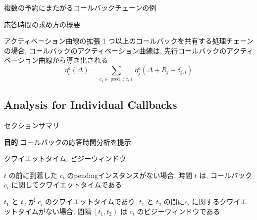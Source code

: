 \begin{frame}{複数の予約にまたがるコールバックチェーンの例}
\end{frame}

\begin{frame}{応答時間の求め方の概要}
\end{frame}

\begin{frame}{アクティベーション曲線の拡張}
    1 つ以上のコールバックを共有する処理チェーンの場合, コールバックのアクティベーション曲線は, 先行コールバックのアクティベーション曲線から導き出される
    \begin{equation*}
        \eta_{i}^{a}(\Delta)=\sum_{c_{j} \in \operatorname{pred}\left(c_{i}\right)} \eta_{j}^{a}\left(\Delta+R_{j}+\delta_{j, i}\right)
    \end{equation*}
\end{frame}


\subsection{Analysis for Individual Callbacks}
\label{ssec: analysis for individual callbacks}

\begin{frame}{セクションサマリ}
    \begin{itembox}[l]{\textbf{目的}}
        コールバックの応答時間分析を提示
    \end{itembox}
\end{frame}

\begin{frame}{クワイエットタイム, ビジーウィンドウ}
    \begin{definition}[クワイエットタイム]
        $t$ の前に到着した $c_{i}$ のpendingインスタンスがない場合, 時間 $t$ は, コールバック $c_{i}$ に関してクワイエットタイムである
    \end{definition}
    \begin{definition}[ビジーウィンドウ]
        $t_{1}$ と $t_{2}$ が $c_{i}$ のクワイエットタイムであり, $t_{1}$ と $t_{2}$ の間に$c_{i}$ に関するクワイエットタイムがない場合, 間隔 $\left[t_{1}, t_{2}\right)$ は $c_{i}$ のビジーウィンドウである
    \end{definition}
\end{frame}

